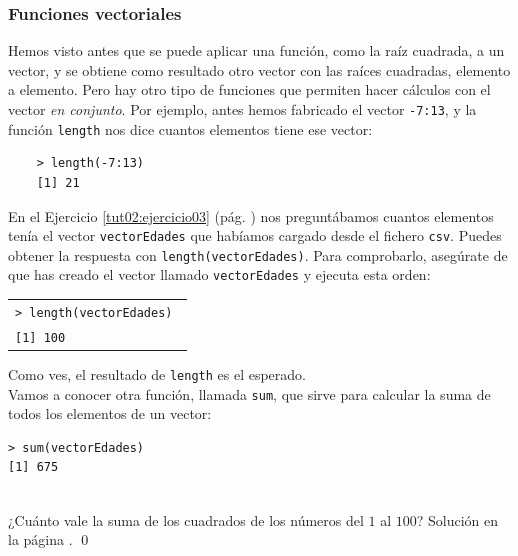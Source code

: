 \documentclass[10pt,a4paper]{article}\usepackage[]{graphicx}\usepackage[]{color}
\begin{document}
\subsubsection*{Funciones vectoriales}

Hemos visto antes que se puede aplicar una función, como la raíz cuadrada, a un vector, y se obtiene como resultado otro vector con las raíces cuadradas, elemento a elemento. Pero hay otro tipo de funciones que permiten hacer cálculos con el vector {\em en conjunto}. Por ejemplo, antes hemos fabricado el vector {\tt -7:13}, y la función {\tt length} nos dice cuantos elementos tiene ese vector:
    \begin{verbatim}
    > length(-7:13)
    [1] 21
    \end{verbatim}
En el Ejercicio \ref{tut02:ejercicio03} (pág. \pageref{tut02:ejercicio03}) nos preguntábamos cuantos elementos tenía el vector {\tt vectorEdades} que habíamos cargado desde el fichero {\tt csv}. Puedes obtener la respuesta con {\tt length(vectorEdades)}. Para comprobarlo, asegúrate de que has creado el vector llamado {\tt vectorEdades} y ejecuta esta orden:
\begin{center}
\begin{tabular}{l}
{\tt > length(vectorEdades) }\\
{\tt [1] 100 }
\end{tabular}
\end{center}
Como ves, el resultado de {\tt length} es el esperado. \\

Vamos a conocer otra función, llamada {\tt sum}, que sirve para calcular la suma de todos los elementos de un vector:
\begin{verbatim}
> sum(vectorEdades)
[1] 675
\end{verbatim}

\begin{ejercicio}
\label{tut02:ejercicio08}
\quad\\
¿Cuánto vale la suma de los cuadrados de los números del $1$ al $100$?
Solución en la página \pageref{tut02:ejercicio08:sol}. \qed
\end{ejercicio}
\end{document}
